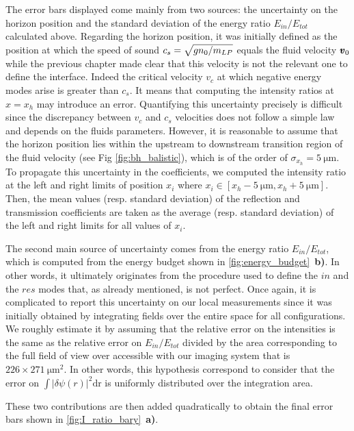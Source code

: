 The error bars displayed come mainly from two sources: the uncertainty on the horizon position and the standard deviation of the energy ratio $E_{in}/E_{tot}$ calculated above.
Regarding the horizon position, it was initially defined as the position at which the speed of sound $c_s=\sqrt{gn_0/m_{LP}}$ equals the fluid velocity $\pmb{v}_0$ while the previous chapter made clear
that this velocity is not the relevant one to define the interface. Indeed the critical velocity $v_c$ at which negative energy modes arise is greater than $c_s$. It means that computing the intensity ratios at $x=x_h$ may introduce an error. Quantifying this uncertainty precisely is difficult since the discrepancy between $v_c$ and $c_s$ velocities does not follow a simple law and depends on the fluids parameters. However, it is reasonable to assume that the horizon position lies within the upstream to downstream transition region of the fluid velocity (see Fig \ref{fig:bh_balistic}), which is of the order of $\sigma_{x_h}=\SI{5}{\micro \meter}$.
To propagate this uncertainty in the coefficients, we computed the intensity ratio at the left and right limits of position $x_i$ where $x_i \in [x_h-\SI{5}{\micro \meter}, x_h+\SI{5}{\micro \meter}]$. Then,
the mean values (resp. standard deviation) of the reflection and transmission coefficients are taken as the average (resp. standard deviation) of the left and right limits for all values of $x_i$. 

The second main source of uncertainty comes from the energy ratio $E_{in}/E_{tot}$, which is computed from the energy budget shown in \autoref{fig:energy_budget}~\textbf{b)}.
In other words, it ultimately originates from the procedure used to define the $in$ and the $res$ modes that, as already mentioned, is not perfect.
Once again, it is complicated to report this uncertainty on our local measurements since it was initially obtained by integrating fields over the entire space for all configurations.
We roughly estimate it by assuming that the relative error on the intensities is the same as the relative error on $E_{in}/E_{tot}$ divided by the area corresponding to the full field of view over accessible with our imaging system that is $226\times\SI{271}{ \micro \meter \squared}$. In other words, this hypothesis correspond to consider that the error on 
$\int |\delta \psi(r)|^2\mathrm{dr}$ is uniformly distributed over the integration area.

These two contributions are then added quadratically to obtain the final error bars shown in \autoref{fig:I_ratio_bary}~\textbf{a)}.


